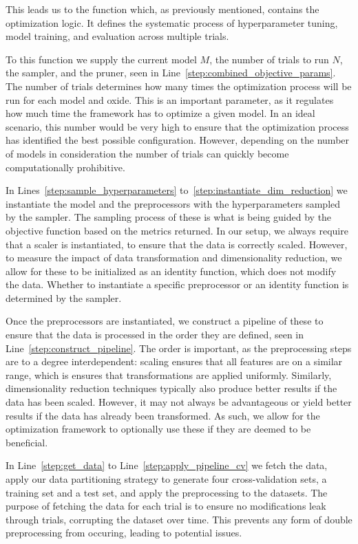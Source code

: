 This leads us to the  function which, as previously mentioned, contains the optimization logic.
It defines the systematic process of hyperparameter tuning, model training, and evaluation across multiple trials.

To this function we supply the current model $M$, the number of trials to run $N$, the sampler, and the pruner, seen in Line~\ref{step:combined_objective_params}.
The number of trials determines how many times the optimization process will be run for each model and oxide.
This is an important parameter, as it regulates how much time the framework has to optimize a given model.
In an ideal scenario, this number would be very high to ensure that the optimization process has identified the best possible configuration.
However, depending on the number of models in consideration the number of trials can quickly become computationally prohibitive.

In Lines~\ref{step:sample_hyperparameters} to~\ref{step:instantiate_dim_reduction} we instantiate the model and the preprocessors with the hyperparameters sampled by the sampler.
The sampling process of these is what is being guided by the objective function based on the metrics returned.
In our setup, we always require that a scaler is instantiated, to ensure that the data is correctly scaled.
However, to measure the impact of data transformation and dimensionality reduction, we allow for these to be initialized as an identity function, which does not modify the data.
Whether to instantiate a specific preprocessor or an identity function is determined by the sampler.

Once the preprocessors are instantiated, we construct a pipeline of these to ensure that the data is processed in the order they are defined, seen in Line~\ref{step:construct_pipeline}.
The order is important, as the preprocessing steps are to a degree interdependent: scaling ensures that all features are on a similar range, which is ensures that transformations are applied uniformly.
Similarly, dimensionality reduction techniques typically also produce better results if the data has been scaled.
However, it may not always be advantageous or yield better results if the data has already been transformed.
As such, we allow for the optimization framework to optionally use these if they are deemed to be beneficial.

In Line~\ref{step:get_data} to Line~\ref{step:apply_pipeline_cv} we fetch the data, apply our data partitioning strategy to generate four cross-validation sets, a training set and a test set, and apply the preprocessing to the datasets.
The purpose of fetching the data for each trial is to ensure no modifications leak through trials, corrupting the dataset over time.
This prevents any form of double preprocessing from occuring, leading to potential issues.

